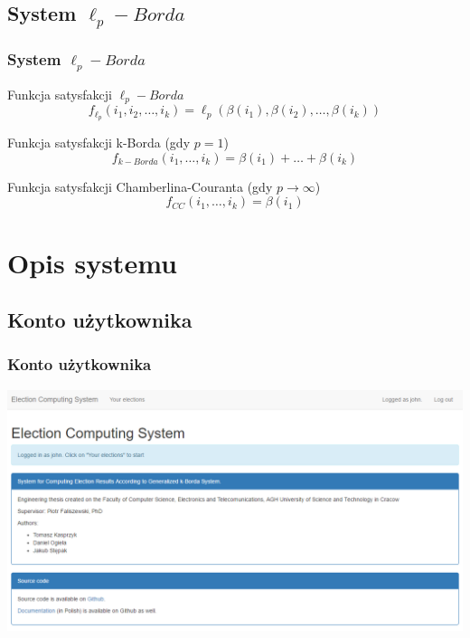 \documentclass{beamer}
\begin{document}

\subsection{System $\ell_p-Borda$}
\begin{frame}
\frametitle{System $\ell_p-Borda$}

\begin{block}{Funkcja satysfakcji $\ell_p-Borda$}
$$
f_{\ell_p}(i_1, i_2, \ldots, i_k ) = \ell_p(\beta(i_1), \beta(i_2), \ldots ,\beta(i_k))
$$
\end{block}
\vspace{\baselineskip}
\vspace{\baselineskip}

\begin{exampleblock}{Funkcja satysfakcji k-Borda (gdy $p = 1$)}
$$
f_{k-Borda}(i_1, \ldots, i_k) = \beta(i_1) + \ldots + \beta(i_k)
$$
\end{exampleblock}

\begin{exampleblock}{Funkcja satysfakcji Chamberlina-Couranta (gdy $p \to \infty$)}
$$
f_{CC}(i_1, \ldots, i_k) = \beta(i_1)
$$
\end{exampleblock}


\end{frame}

\section{Opis systemu}
\subsection{Konto użytkownika}
\begin{frame}
\frametitle{Konto użytkownika}
\includegraphics[width=0.9\paperwidth]{pics/home_page.png}
\end{frame}
\end{document}
